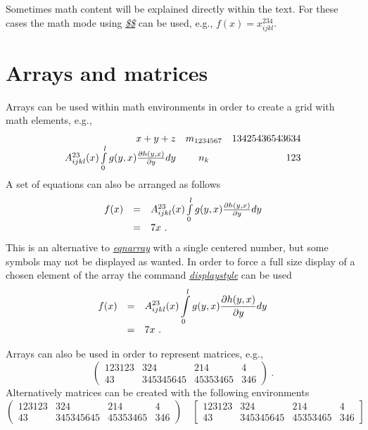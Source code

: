 \documentclass[a4paper,11pt,oneside]{book}
\newcommand{\imp}[1]{\underline{\textit{#1}}}
\begin{document}
Sometimes math content will be explained directly within the text. For these cases the math mode using \imp{\$\$} can be used, e.g., $f(x) = x^{234}_{ijkl}$.


\section{Arrays and matrices}

Arrays can be used within math environments in order to create a grid with math elements, e.g.,
\begin{equation}
	\begin{array}{rcr}
	x + y + z 
		& m_{1234567} 
		& 13425436543634 \\
	A^{23}_{ijkl}(x) \int_0^l\limits g(y,x) \frac{\partial h(y,x)}{\partial y} d y 
		& n_{k} 
		& 123
	\end{array}
\end{equation}
A set of equations can also be arranged as follows
\begin{equation}
	\begin{array}{rcl}
	f(x)
	&=& A^{23}_{ijkl}(x) \int_0^l\limits g(y,x) \frac{\partial h(y,x)}{\partial y} d y \\
	&=& 7 x \ .
	\end{array}
\end{equation}
This is an alternative to \imp{eqnarray} with a single centered number, but some symbols may not be displayed as wanted. In order to force a full size display of a chosen element of the array the command \imp{displaystyle} can be used
\begin{equation}
	\begin{array}{rcl}
	f(x)
	&=& \displaystyle A^{23}_{ijkl}(x) \int_0^l\limits g(y,x) \frac{\partial h(y,x)}{\partial y} d y \\
	&=& 7 x \ .
	\end{array}
\end{equation} 

Arrays can also be used in order to represent matrices, e.g., 
\begin{equation}
	\left(
	\begin{array}{cccc}
	123123 & 324 & 214 & 4 \\
	43& 345345645 & 45353465 & 346
	\end{array}
	\right) \ .
\end{equation}
Alternatively matrices can be created with the following environments
\begin{equation}
	\begin{pmatrix}
	123123 & 324 & 214 & 4 \\
	43& 345345645 & 45353465 & 346
	\end{pmatrix} 
	\quad
	\begin{bmatrix}
	123123 & 324 & 214 & 4 \\
	43& 345345645 & 45353465 & 346
	\end{bmatrix}
\end{equation}
\end{document}
